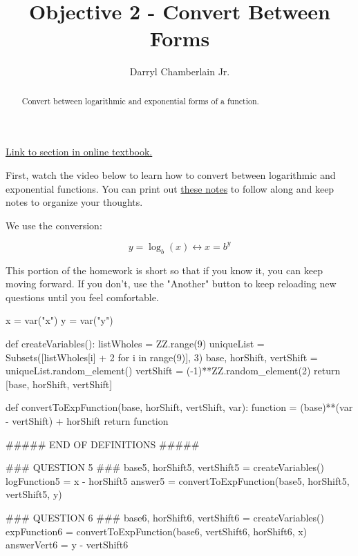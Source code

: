 \documentclass{ximera}
\author{Darryl Chamberlain Jr.}
\title{Objective 2 - Convert Between Forms}
\begin{document}
\begin{abstract}
Convert between logarithmic and exponential forms of a function.
\end{abstract}
\maketitle

\href{https://cnx.org/contents/mwjClAV_@8.1:dGtL5139@10/Logarithmic-Functions}{Link to section in online textbook.}


First, watch the video below to learn how to convert between logarithmic and exponential functions. You can print out \href{http://people.clas.ufl.edu/dchamberlain31/files/Objective-2-Converting-Between-Forms.pdf}{these notes} to follow along and keep notes to organize your thoughts.


We use the conversion: 

$$ y = \log_b{(x)} \leftrightarrow x = b^y$$

This portion of the homework is short so that if you know it, you can keep moving forward. If you don't, use the "Another" button to keep reloading new questions until you feel comfortable. 


\begin{sagesilent}
x = var("x")
y = var("y")

def createVariables():
    listWholes = ZZ.range(9)
    uniqueList = Subsets([listWholes[i] + 2 for i in range(9)], 3)
    base, horShift, vertShift = uniqueList.random_element()
    vertShift = (-1)**ZZ.random_element(2)
    return [base, horShift, vertShift]

def convertToExpFunction(base, horShift, vertShift, var):
    function = (base)**(var - vertShift) + horShift
    return function
    
##### END OF DEFINITIONS #####

### QUESTION 5 ###
base5, horShift5, vertShift5 = createVariables()
logFunction5 = x - horShift5
answer5 = convertToExpFunction(base5, horShift5, vertShift5, y)

### QUESTION 6 ###
base6, horShift6, vertShift6 = createVariables()
expFunction6 = convertToExpFunction(base6, vertShift6, horShift6, x)
answerVert6 = y - vertShift6
\end{sagesilent}
\end{document}
